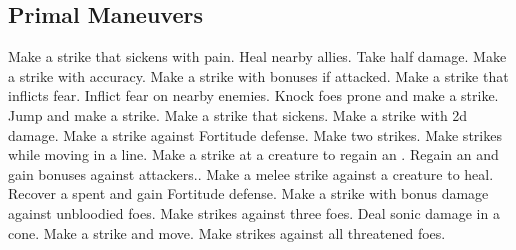 \subsection{Primal Maneuvers}\label{Primal Maneuvers}
\begin{spelllist}
 Make a strike that sickens with pain.
 Heal nearby allies.
 Take half damage.
 Make a strike with  accuracy.
 Make a strike with bonuses if attacked.
 Make a strike that inflicts fear.
 Inflict fear on nearby enemies.
 Knock foes prone and make a strike.
 Jump and make a strike.
 Make a strike that sickens.
 Make a strike with \plus2d damage.
 Make a strike against Fortitude defense.
 Make two strikes.
 Make strikes while moving in a line.
 Make a strike at a creature to regain an .
 Regain an  and gain bonuses against attackers..
 Make a melee strike against a creature to heal.
 Recover a spent  and gain  Fortitude defense.
 Make a strike with bonus damage against unbloodied foes.
 Make strikes against three foes.
 Deal sonic damage in a cone.
 Make a strike and move.
 Make strikes against all threatened foes.
\end{spelllist}



\small
